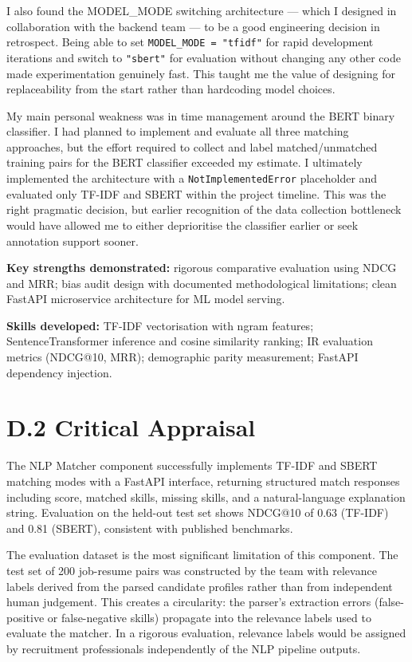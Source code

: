 I also found the MODEL\_MODE switching architecture --- which I designed in collaboration with the backend team --- to be a good engineering decision in retrospect. Being able to set \texttt{MODEL\_MODE = "tfidf"} for rapid development iterations and switch to \texttt{"sbert"} for evaluation without changing any other code made experimentation genuinely fast. This taught me the value of designing for replaceability from the start rather than hardcoding model choices.

My main personal weakness was in time management around the BERT binary classifier. I had planned to implement and evaluate all three matching approaches, but the effort required to collect and label matched/unmatched training pairs for the BERT classifier exceeded my estimate. I ultimately implemented the architecture with a \texttt{NotImplementedError} placeholder and evaluated only TF-IDF and SBERT within the project timeline. This was the right pragmatic decision, but earlier recognition of the data collection bottleneck would have allowed me to either deprioritise the classifier earlier or seek annotation support sooner.

\textbf{Key strengths demonstrated:} rigorous comparative evaluation using NDCG and MRR; bias audit design with documented methodological limitations; clean FastAPI microservice architecture for ML model serving.

\textbf{Skills developed:} TF-IDF vectorisation with ngram features; SentenceTransformer inference and cosine similarity ranking; IR evaluation metrics (NDCG@10, MRR); demographic parity measurement; FastAPI dependency injection.

\section*{D.2 Critical Appraisal}

The NLP Matcher component successfully implements TF-IDF and SBERT matching modes with a FastAPI interface, returning structured match responses including score, matched skills, missing skills, and a natural-language explanation string. Evaluation on the held-out test set shows NDCG@10 of 0.63 (TF-IDF) and 0.81 (SBERT), consistent with published benchmarks.

The evaluation dataset is the most significant limitation of this component. The test set of 200 job-resume pairs was constructed by the team with relevance labels derived from the parsed candidate profiles rather than from independent human judgement. This creates a circularity: the parser's extraction errors (false-positive or false-negative skills) propagate into the relevance labels used to evaluate the matcher. In a rigorous evaluation, relevance labels would be assigned by recruitment professionals independently of the NLP pipeline outputs.

